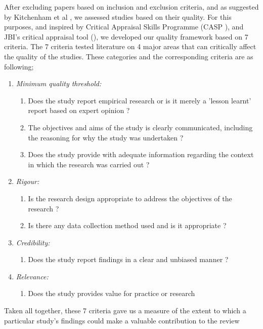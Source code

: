 \documentclass[review]{elsarticle}
\begin{document}
After excluding papers based on inclusion and exclusion criteria, and as suggested by Kitchenham et al \cite{kitchenham2015evidence}, we assessed studies based on their quality. For this purposes, and inspired by Critical Appraisal Skills Programme (CASP \cite{CASP}), and JBI's critical appraisal tool (\cite{JBI}), we developed our quality framework based on 7 criteria. The 7 criteria tested literature on 4 major areas that can critically affect the quality of the studies. These categories and the corresponding criteria are as following;

\begin{enumerate}
    \item \emph{Minimum quality threshold:} 
    \begin{enumerate}
        \item Does the study report empirical research or is it merely a 'lesson learnt' report based on expert opinion ?
        \item The objectives and aims of the study is clearly communicated, including the reasoning for why the study was undertaken ? 
        \item Does the study provide with adequate information regarding the context in which the research was carried out ?
    \end{enumerate}
    \item \emph{Rigour:}
    \begin{enumerate}
        \item Is the research design appropriate to address the objectives of the research ?
        \item Is there any data collection method used and is it appropriate ?
    \end{enumerate}
    \item \emph{Credibility:}
      \begin{enumerate}
        \item Does the study report findings in a clear and unbiased manner ? 
     \end{enumerate}
    \item \emph{Relevance:}
    \begin{enumerate}
        \item Does the study provides value for practice or research 
     \end{enumerate}
\end{enumerate}

Taken all together, these 7 criteria gave us a measure of the extent to which a particular study's findings could make a valuable contribution to the review
\end{document}
